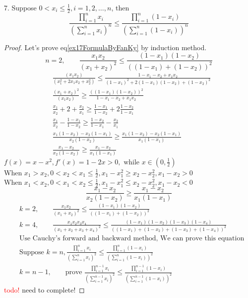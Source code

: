 \begin{example}
	7. Suppose $ 0<x_i\le \frac{1}{2}, i=1,2,\dots,n $, then
	\begin{equation}\label{ex17FormulaByFanKy}
		\frac{\prod_{i=1}^n x_i}{(\sum_{i=1}^n x_i)^n} \le \frac{\prod_{i=1}^n(1-x_i)}{(\sum_{i=1}^n(1-x_i))^n}
	\end{equation}
\begin{proof}
	Let's prove eq\ref{ex17FormulaByFanKy} by induction method.
	\begin{equation*}
		n=2,\qquad \frac{x_1x_2}{(x_1+x_2)^2}\le \frac{(1-x_1)(1-x_2)}{((1-x_1)+(1-x_2))^2}
	\end{equation*}
	\begin{align*}
		&\frac{(x_1x_2)}{(x_1^2+2x_1x_2+x_2^2)} \le \frac{1-x_1-x_2+x_1x_2}{(1-x_1)^2+2(1-x_1)(1-x_2)+(1-x_2)^2}\\
		&\frac{(x_1+x_2)^2}{(x_1x_2)} \ge \frac{((1-x_1)(1-x_2))^2}{1-x_1-x_2+x_1x_2}\\
		&\frac{x_1}{x_2} + 2 + \frac{x_2}{x_1} \ge \frac{1-x_1}{1-x_2} + 2\frac{1-x_2}{1-x_1}\\
		&\frac{x_1}{x_2} - \frac{1-x_1}{1-x_2} \ge \frac{1-x_2}{1-x_1} - \frac{x_2}{x_1}\\
		&\frac{x_1(1-x_2) - x_2(1-x_1)}{x_2(1-x_2)} \ge \frac{x_1(1-x_2)-x_2(1-x_1)}{x_1(1-x_1)}\\
		&\frac{x_1-x_2}{x_2(1-x_2)} \ge \frac{x_1 - x_2}{x_1(1-x_1)}
	\end{align*}
$ f(x) = x-x^2, f'(x) = 1-2x>0,\text{ while }x\in(0,\frac{1}{2})  $\\
When $ x_1>x_2 , 0<x_2<x_1\le \frac{1}{2}, x_1-x_1^2 \ge x_2-x_2^2, x_1-x_2>0$\\
When $ x_1<x_2 , 0<x_1<x_2\le \frac{1}{2}, x_1-x_1^2 \le x_2-x_2^2, x_1-x_2<0$\\
\begin{equation*}
	 \frac{x_1-x_2}{x_2(1-x_2)} \ge \frac{x_1 - x_2}{x_1(1-x_1)} 
\end{equation*}
\begin{align*}
	&k=2,\qquad \frac{x_1x_2}{(x_1+x_2)^2}\le \frac{(1-x_1)(1-x_2)}{((1-x_1)+(1-x_2))^2}\\
	&k=4,\qquad \frac{x_1x_2x_3x_4}{(x_1+x_2+x_3+x_4)^2}\le 
	\frac{(1-x_1)(1-x_2)(1-x_3)(1-x_4)}{((1-x_1)+(1-x_2)+(1-x_3)+(1-x_4))^2}\\
	&\text{Use Cauchy's forward and backward method, We can prove this equation}\\
	&\text{Suppose }k=n,\frac{\prod_{i=1}^n x_i}{(\sum_{i=1}^n x_i)^2} \le 
	\frac{\prod_{i=1}^n (1-x_i)}{(\sum_{i=1}^n (1-x_i))^2}\\
	&k = n-1,\qquad \text{prove  } \frac{\prod_{i=1}^{n-1} x_i}{(\sum_{i=1}^{n-1} x_i)^2} \le 
	\frac{\prod_{i=1}^{n-1} (1-x_i)}{(\sum_{i=1}^{n-1} (1-x_i))^2}
\end{align*}
\textcolor{red}{todo!} need to complete!


\end{proof}
\end{example}
